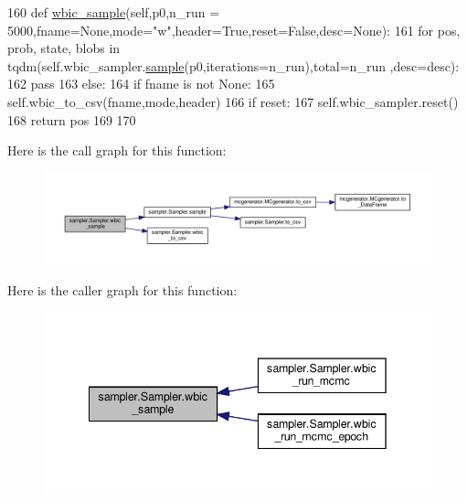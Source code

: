 \begin{DoxyCode}
160     \textcolor{keyword}{def }\hyperlink{classsampler_1_1Sampler_ad07e2a415fe1c3890c6f6efcfe7515db}{wbic\_sample}(self,p0,n\_run = 5000,fname=None,mode="w",header=True,reset=False,desc=None):
161         \textcolor{keywordflow}{for} pos, prob, state, blobs \textcolor{keywordflow}{in} tqdm(self.wbic\_sampler.\hyperlink{classsampler_1_1Sampler_a9403aa08f08af30f703b7b507431d7a9}{sample}(p0,iterations=n\_run),total=n\_run
      ,desc=desc):
162             \textcolor{keywordflow}{pass}
163         \textcolor{keywordflow}{else}:
164             \textcolor{keywordflow}{if} fname \textcolor{keywordflow}{is} \textcolor{keywordflow}{not} \textcolor{keywordtype}{None}:
165                 self.wbic\_to\_csv(fname,mode,header)
166             \textcolor{keywordflow}{if} reset:
167                 self.wbic\_sampler.reset()
168             \textcolor{keywordflow}{return} pos
169     
170     
\end{DoxyCode}
Here is the call graph for this function\+:\nopagebreak
\begin{figure}[H]
\begin{center}
\leavevmode
\includegraphics[width=350pt]{d3/d8a/classsampler_1_1Sampler_ad07e2a415fe1c3890c6f6efcfe7515db_cgraph}
\end{center}
\end{figure}
Here is the caller graph for this function\+:\nopagebreak
\begin{figure}[H]
\begin{center}
\leavevmode
\includegraphics[width=342pt]{d3/d8a/classsampler_1_1Sampler_ad07e2a415fe1c3890c6f6efcfe7515db_icgraph}
\end{center}
\end{figure}
\mbox{\label{classsampler_1_1Sampler_a6ade3671106e25577cd51ea1a055b680}} 
